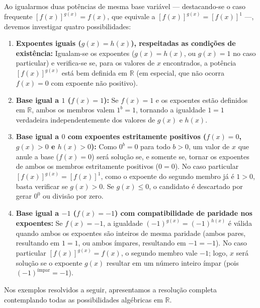 \documentclass[12pt,a4paper]{report}
\begin{document}
	\begin{destaque}[{Caso III: Equações da forma $[f(x)]^{g(x)} = [f(x)]^{h(x)}$ (e o caso particular $[f(x)]^{g(x)} = f(x)$)}]
		Ao igualarmos duas potências de mesma base variável — destacando-se o caso frequente $[f(x)]^{g(x)} = f(x)$, que equivale a $[f(x)]^{g(x)} = [f(x)]^1$ —, devemos investigar quatro possibilidades:
		\begin{enumerate}
			\item \textbf{Expoentes iguais ($g(x) = h(x)$), respeitadas as condições de existência:}
			Igualam-se os expoentes ($g(x) = h(x)$, ou $g(x) = 1$ no caso particular) e verifica-se se, para os valores de $x$ encontrados, a potência $[f(x)]^{g(x)}$ está bem definida em $\mathbb{R}$ (em especial, que não ocorra $f(x) = 0$ com expoente não positivo).
			\item \textbf{Base igual a $1$ ($f(x) = 1$):}
			Se $f(x) = 1$ e os expoentes estão definidos em $\mathbb{R}$, ambos os membros valem $1^b = 1$, tornando a igualdade $1 = 1$ verdadeira independentemente dos valores de $g(x)$ e $h(x)$.
			\item \textbf{Base igual a $0$ com expoentes estritamente positivos ($f(x) = 0$, $g(x) > 0$ e $h(x) > 0$):}
			Como $0^b = 0$ para todo $b > 0$, um valor de $x$ que anule a base ($f(x) = 0$) será solução se, e somente se, tornar os expoentes de ambos os membros estritamente positivos ($0 = 0$). No caso particular $[f(x)]^{g(x)} = [f(x)]^1$, como o expoente do segundo membro já é $1 > 0$, basta verificar se $g(x) > 0$. Se $g(x) \leqslant 0$, o candidato é descartado por gerar $0^0$ ou divisão por zero.
			\item \textbf{Base igual a $-1$ ($f(x) = -1$) com compatibilidade de paridade nos expoentes:}
			Se $f(x) = -1$, a igualdade $(-1)^{g(x)} = (-1)^{h(x)}$ é válida quando ambos os expoentes são inteiros de mesma paridade (ambos pares, resultando em $1 = 1$, ou ambos ímpares, resultando em $-1 = -1$). No caso particular $[f(x)]^{g(x)} = f(x)$, o segundo membro vale $-1$; logo, $x$ será solução se o expoente $g(x)$ resultar em um número inteiro ímpar (pois $(-1)^{\text{ímpar}} = -1$).
		\end{enumerate}
	\end{destaque}
	

	Nos exemplos resolvidos a seguir, apresentamos a resolução completa contemplando todas as possibilidades algébricas em $\mathbb{R}$.
	
	\vspace{0.3cm}
	
\end{document}
